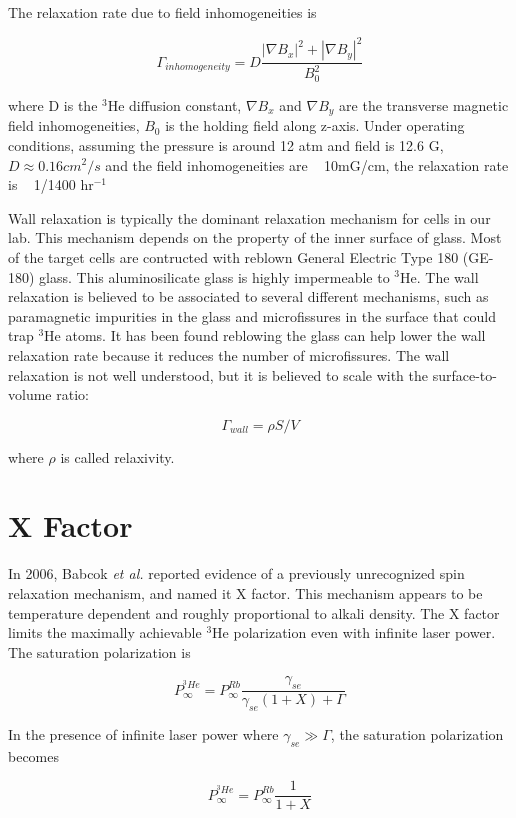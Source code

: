 The relaxation rate due to field inhomogeneities is

\begin{equation}
\Gamma_{inhomogeneity} = D\frac{|\nabla B_{x}|^{2}+|\nabla B_{y}|^{2}}{B_{0}^{2}}
\end{equation}

where D is the $^{3}$He diffusion constant, $\nabla B_{x}$ and $\nabla B_{y}$ are the transverse magnetic field inhomogeneities, $B_{0}$ is the holding field along z-axis. Under operating conditions, assuming the pressure is around 12 atm and field is 12.6 G, $D\approx 0.16cm^{2}/s$ and the field inhomogeneities are ~ 10mG/cm, the relaxation rate is ~ 1/1400 hr$^{-1}$

Wall relaxation is typically the dominant relaxation mechanism for cells in our lab. This mechanism depends on the property of the inner surface of glass. Most of the target cells are contructed with reblown General Electric Type 180 (GE-180) glass. This aluminosilicate glass is highly impermeable to $^{3}$He. The wall relaxation is believed to be associated to several different mechanisms, such as paramagnetic impurities in the glass and microfissures in the surface that could trap $^{3}$He atoms. It has been found reblowing the glass can help lower the wall relaxation rate because it reduces the number of microfissures. The wall relaxation is not well understood, but it is believed to scale with the surface-to-volume ratio:

\begin{equation}
\Gamma_{wall} = \rho S/V
\end{equation}

where $\rho$ is called relaxivity.

\section{X Factor}

In 2006, Babcok \emph{et al.} reported evidence of a previously unrecognized spin relaxation mechanism, and named it X factor. This mechanism appears to be temperature dependent and roughly proportional to alkali density. The X factor limits the maximally achievable $^{3}$He polarization even with infinite laser power. The saturation polarization is 

\begin{equation}
P_{\infty}^{^{3}He}=P_{\infty}^{Rb}\frac{\gamma_{se}}{\gamma_{se}(1+X)+\Gamma}
\end{equation}

In the presence of infinite laser power where $\gamma_{se} \gg \Gamma$, the saturation polarization becomes

\begin{equation}
P_{\infty}^{^{3}He}=P_{\infty}^{Rb}\frac{1}{1+X}
\end{equation}


















